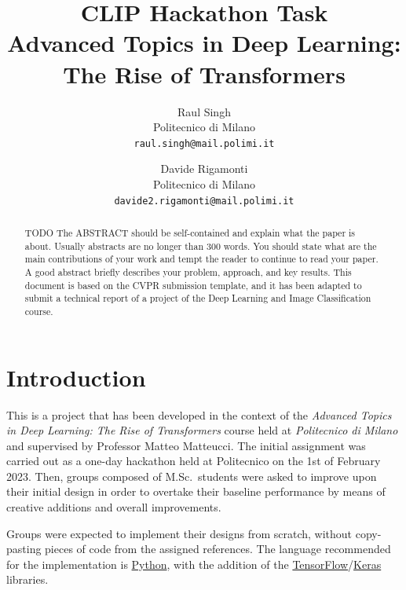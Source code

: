 \documentclass[10pt,twocolumn,letterpaper]{article}
\begin{document}
\title{CLIP Hackathon Task \\ \normalsize\bfseries Advanced Topics in Deep Learning: The Rise of Transformers}

\author{Raul Singh\\
Politecnico di Milano\\
{\tt\small raul.singh@mail.polimi.it}
\and
Davide Rigamonti\\
Politecnico di Milano\\
{\tt\small davide2.rigamonti@mail.polimi.it}
}

\maketitle

\begin{abstract}
   TODO The ABSTRACT should be self-contained and explain what the paper is about. Usually abstracts are no longer than 300 words. You should state what are the main contributions of your work and tempt the reader to continue to read your paper. A good abstract briefly describes your problem, approach, and key results. This document is based on the CVPR submission template, and it has been adapted to submit a technical report of a project of the Deep Learning and Image Classification course.
\end{abstract}

\section{Introduction}
This is a project that has been developed in the context of the \textit{Advanced Topics in Deep Learning: The Rise of Transformers} course held at \textit{Politecnico di Milano} and supervised by Professor Matteo Matteucci.
The initial assignment was carried out as a one-day hackathon held at Politecnico on the 1st of February 2023.
Then, groups composed of M.Sc.\ students were asked to improve upon their initial design in order to overtake their baseline performance by means of creative additions and overall improvements.

Groups were expected to implement their designs from scratch, without copy-pasting pieces of code from the assigned references.
The language recommended for the implementation is \href{https://www.python.org/}{Python}, with the addition of the \href{https://www.tensorflow.org/}{TensorFlow}/\href{https://keras.io/}{Keras} libraries.
\end{document}
